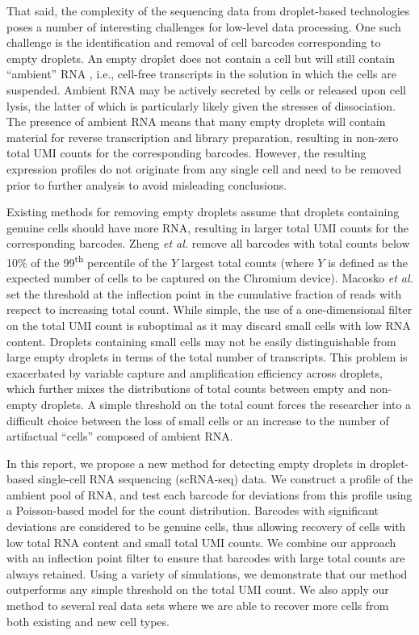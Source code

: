 \documentclass[10pt,letterpaper]{article}
\begin{document}
That said, the complexity of the sequencing data from droplet-based technologies poses a number of interesting challenges for low-level data processing.
One such challenge is the identification and removal of cell barcodes corresponding to empty droplets.
An empty droplet does not contain a cell but will still contain ``ambient'' RNA \cite{macosko2015highly}, i.e., cell-free transcripts in the solution in which the cells are suspended.
Ambient RNA may be actively secreted by cells or released upon cell lysis, the latter of which is particularly likely given the stresses of dissociation.
The presence of ambient RNA means that many empty droplets will contain material for reverse transcription and library preparation, resulting in non-zero total UMI counts for the corresponding barcodes.
However, the resulting expression profiles do not originate from any single cell and need to be removed prior to further analysis to avoid misleading conclusions.

Existing methods for removing empty droplets assume that droplets containing genuine cells should have more RNA, resulting in larger total UMI counts for the corresponding barcodes.
Zheng \textit{et al.} \cite{zheng2017massively} remove all barcodes with total counts below 10\% of the 99\textsuperscript{th} percentile of the $Y$ largest total counts (where $Y$ is defined as the expected number of cells to be captured on the Chromium device).
Macosko \textit{et al.} \cite{macosko2015highly} set the threshold at the inflection point in the cumulative fraction of reads with respect to increasing total count.
While simple, the use of a one-dimensional filter on the total UMI count is suboptimal as it may discard small cells with low RNA content.
Droplets containing small cells may not be easily distinguishable from large empty droplets in terms of the total number of transcripts.
This problem is exacerbated by variable capture and amplification efficiency across droplets, which further mixes the distributions of total counts between empty and non-empty droplets.
A simple threshold on the total count forces the researcher into a difficult choice between the loss of small cells or an increase to the number of artifactual ``cells'' composed of ambient RNA.

In this report, we propose a new method for detecting empty droplets in droplet-based single-cell RNA sequencing (scRNA-seq) data.
We construct a profile of the ambient pool of RNA, and test each barcode for deviations from this profile using a Poisson-based model for the count distribution.
Barcodes with significant deviations are considered to be genuine cells, thus allowing recovery of cells with low total RNA content and small total UMI counts.
We combine our approach with an inflection point filter to ensure that barcodes with large total counts are always retained.
Using a variety of simulations, we demonstrate that our method outperforms any simple threshold on the total UMI count.
We also apply our method to several real data sets where we are able to recover more cells from both existing and new cell types.
\end{document}
